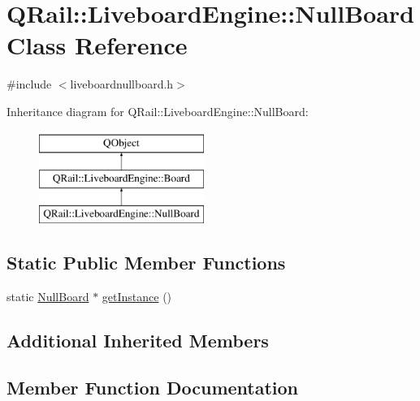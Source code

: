 \hypertarget{classQRail_1_1LiveboardEngine_1_1NullBoard}{}\section{Q\+Rail\+::Liveboard\+Engine\+::Null\+Board Class Reference}
\label{classQRail_1_1LiveboardEngine_1_1NullBoard}


{\ttfamily \#include $<$liveboardnullboard.\+h$>$}

Inheritance diagram for Q\+Rail\+::Liveboard\+Engine\+::Null\+Board\+:\begin{figure}[H]
\begin{center}
\leavevmode
\includegraphics[height=3.000000cm]{classQRail_1_1LiveboardEngine_1_1NullBoard}
\end{center}
\end{figure}
\subsection*{Static Public Member Functions}
\begin{DoxyCompactItemize}
\item 
static \mbox{\hyperlink{classQRail_1_1LiveboardEngine_1_1NullBoard}{Null\+Board}} $\ast$ \mbox{\hyperlink{classQRail_1_1LiveboardEngine_1_1NullBoard_a2d20874ccfcb5be744626e3b97b036fa}{get\+Instance}} ()
\end{DoxyCompactItemize}
\subsection*{Additional Inherited Members}


\subsection{Member Function Documentation}
\mbox{\label{classQRail_1_1LiveboardEngine_1_1NullBoard_a2d20874ccfcb5be744626e3b97b036fa}} 

